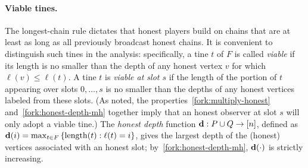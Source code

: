  \paragraph{Viable tines.}
 The longest-chain rule dictates that honest players build on chains
 that are at least as long as all previously broadcast honest
 chains. It is convenient to distinguish such tines in the analysis:
 specifically, a tine $t$ of $F$ is called \emph{viable} if its length
 is no smaller than the depth of any honest vertex $v$ for which
 $\ell(v) \leq \ell(t)$. A tine $t$ is \emph{viable at slot $s$} if
 the length of the portion of $t$ appearing over slots $0,\ldots, s$ 
 is no smaller than the depths of any honest vertices labeled from these slots. (As noted,
 the properties~\ref{fork:multiply-honest} and~\ref{fork:honest-depth-mh}
 together imply that an honest observer at slot $s$ will only adopt a
 viable tine.)  
 The \emph{honest depth} function
 $\mathbf{d} : P \cup Q \rightarrow [n]$, 
 defined as $\mathbf{d}(i) = \max_{t \in F} \left\{ \operatorname{length}(t) : \ell(t) = i \right\}$, 
 gives the largest depth of the (honest) vertices 
 associated with an honest slot; by~\ref{fork:honest-depth-mh},
 $\mathbf{d}(\cdot)$ is strictly increasing.








